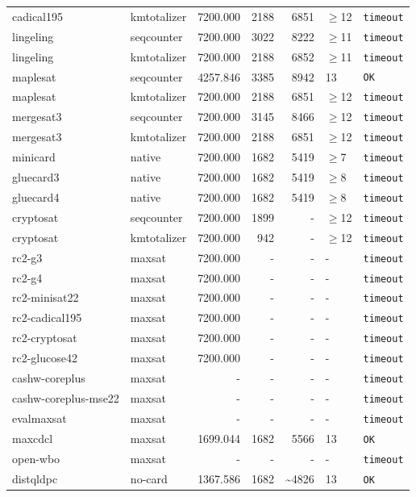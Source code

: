 \begin{longtable}{llrrrl p{}}
cadical195 & kmtotalizer & 7200.000 & 2188 & 6851 & $\geq$12 & \texttt{timeout} \\
lingeling & seqcounter & 7200.000 & 3022 & 8222 & $\geq$11 & \texttt{timeout} \\
lingeling & kmtotalizer & 7200.000 & 2188 & 6852 & $\geq$11 & \texttt{timeout} \\
maplesat & seqcounter & 4257.846 & 3385 & 8942 & 13 & \texttt{OK} \\
maplesat & kmtotalizer & 7200.000 & 2188 & 6851 & $\geq$12 & \texttt{timeout} \\
mergesat3 & seqcounter & 7200.000 & 3145 & 8466 & $\geq$12 & \texttt{timeout} \\
mergesat3 & kmtotalizer & 7200.000 & 2188 & 6851 & $\geq$12 & \texttt{timeout} \\
minicard & native & 7200.000 & 1682 & 5419 & $\geq$7 & \texttt{timeout} \\
gluecard3 & native & 7200.000 & 1682 & 5419 & $\geq$8 & \texttt{timeout} \\
gluecard4 & native & 7200.000 & 1682 & 5419 & $\geq$8 & \texttt{timeout} \\
cryptosat & seqcounter & 7200.000 & 1899 & - & $\geq$12 & \texttt{timeout} \\
cryptosat & kmtotalizer & 7200.000 & 942 & - & $\geq$12 & \texttt{timeout} \\
rc2-g3 & maxsat & 7200.000 & - & - & - & \texttt{timeout} \\
rc2-g4 & maxsat & 7200.000 & - & - & - & \texttt{timeout} \\
rc2-minisat22 & maxsat & 7200.000 & - & - & - & \texttt{timeout} \\
rc2-cadical195 & maxsat & 7200.000 & - & - & - & \texttt{timeout} \\
rc2-cryptosat & maxsat & 7200.000 & - & - & - & \texttt{timeout} \\
rc2-glucose42 & maxsat & 7200.000 & - & - & - & \texttt{timeout} \\
cashw-coreplus & maxsat & - & - & - & - & \texttt{timeout} \\
cashw-coreplus-mse22 & maxsat & - & - & - & - & \texttt{timeout} \\
evalmaxsat & maxsat & - & - & - & - & \texttt{timeout} \\
maxcdcl & maxsat & 1699.044 & 1682 & 5566 & 13 & \texttt{OK} \\
open-wbo & maxsat & - & - & - & - & \texttt{timeout} \\
distqldpc & no-card & 1367.586 & 1682 & \textasciitilde{}4826 & 13 & \texttt{OK} \\

\end{longtable}
